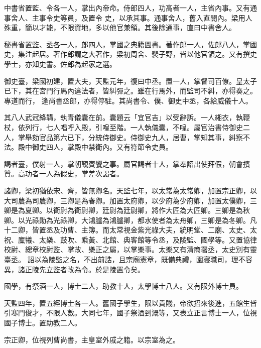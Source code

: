 \begin{pinyinscope}
 中書省置監、令各一人，掌出內帝命。侍郎四人，功高者一人，主省內事。又有通事舍人、主事令史等員，及置令
 史，以承其事。通事舍人，舊入直閤內。梁用人殊重，簡以才能，不限資地，多以他官兼領。其後除通事，直曰中書舍人。



 秘書省置監、丞各一人，郎四人，掌國之典籍圖書。著作郎一人，佐郎八人，掌國史，集注起居。著作郎謂之大著作，梁初周舍、裴子野，皆以他官領之。又有撰史學士，亦知史書。佐郎為起家之選。



 御史臺，梁國初建，置大夫，天監元年，復曰中丞。置一人，掌督司百僚。皇太子已下，其在宮門行馬內違法者，皆糾彈之。雖在行馬外，而監司不糾，亦得奏之。專道而行，
 逢尚書丞郎，亦得停駐。其尚書令、僕、御史中丞，各給威儀十人。



 其八人武冠絳韝，執青儀囊在前。囊題云「宜官吉」以受辭訴。一人緗衣，執鞭杖，依列行，七人唱呼入殿，引喤至階。一人執儀囊，不喤。屬官治書侍御史二人，掌舉劾官品第六已下，分統侍御史。侍御史九人，居曹，掌知其事，糾察不法。殿中御史四人，掌殿中禁衛內。又有符節令史員。



 謁者臺，僕射一人，掌朝覲賓饗之事。屬官謁者十人，掌奉詔出使拜假，朝會擯贊。高功者一人為假史，掌差次謁者。



 諸卿，梁初猶依宋、齊，皆無卿名。天監七年，以太常為太常卿，加置宗正卿，以大司農為司農卿，三卿是為春卿。加置太府卿，以少府為少府卿，加置太僕卿，三卿是為夏卿。以衛尉為衛尉卿，廷尉為廷尉卿，將作大匠為大匠卿。三卿是為秋卿。以光祿勛為光祿卿，大鴻臚為鴻臚卿，都水使者為太舟卿，三卿是為冬卿。凡十二卿，皆置丞及功曹、主簿。而太常視金紫光祿大夫，統明堂、二廟、太史、太祝、廩犧、太樂、鼓吹、乘黃、北館、典客館等令丞，及陵監、國學等。又置協律校尉、總章校尉監、掌故、樂正之屬，以掌樂事。太樂又有清商署丞，太史別有靈臺丞。
 詔以為陵監之名，不出前誥，且宗廟憲章，既備典禮，園寢職司，理不容異，諸正陵先立監者改為令。於是陵置令矣。



 國學，有祭酒一人，博士二人，助教十人，太學博士八人。又有限外博士員。



 天監四年，置五經博士各一人。舊國子學生，限以貴賤，帝欲招來後進，五館生皆引寒門俊才，不限人數。大同七年，國子祭酒到溉等，又表立正言博士一人，位視國子博士。置助教二人。



 宗正卿，位視列曹尚書，主皇室外戚之籍。以宗室為之。




\end{pinyinscope}

